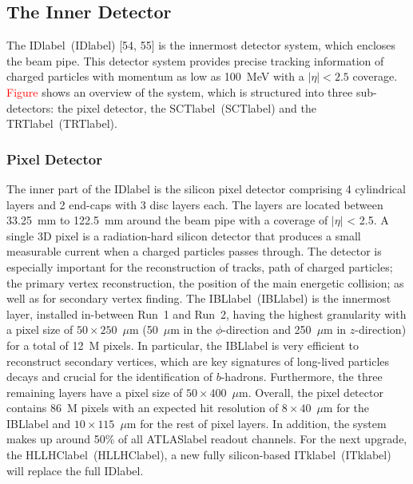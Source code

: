 \subsection{The Inner Detector}

The \acrlong{IDlabel}~(\acrshort{IDlabel}) [54, 55] is the innermost detector system, which encloses the beam pipe. This detector system provides precise tracking information of charged particles with momentum as low as 100~MeV with a $|\eta|<2.5$ coverage. \textcolor{red}{Figure} shows an overview of the system, which is structured into three sub-detectors: the pixel detector, the \acrlong{SCTlabel}~(\acrshort{SCTlabel}) and the \acrlong{TRTlabel}~(\acrshort{TRTlabel}).



\subsubsection*{Pixel Detector}

The inner part of the \acrshort{IDlabel} is the silicon pixel detector comprising 4 cylindrical layers and 2 end-caps with 3 disc layers each. The layers are located between 33.25~mm to 122.5~mm around the beam pipe with a coverage of $|\eta|$ < 2.5. A single 3D pixel is a radiation-hard silicon detector that produces a small measurable current when a charged particles passes through. The detector is especially important for the reconstruction of tracks, path of charged particles; the primary vertex reconstruction, the position of the main energetic collision; as well as for secondary vertex finding. The \acrlong{IBLlabel}~(\acrshort{IBLlabel}) is the innermost layer, installed in-between Run~1 and Run~2, having the highest granularity with a pixel size of $50\times 250$~$\mu$m (50~$\mu$m in the $\phi$-direction and 250~$\mu$m in $z$-direction) for a total of 12~M pixels. In particular, the \acrshort{IBLlabel} is very efficient to reconstruct secondary vertices, which are key signatures of long-lived particles decays and crucial for the identification of $b$-hadrons. Furthermore, the three remaining layers have a pixel size of $50\times 400$~$\mu$m. Overall, the pixel detector contains 86~M pixels with an expected hit resolution of $8\times 40$~$\mu$m for the \acrshort{IBLlabel} and $10\times 115$~$\mu$m for the rest of pixel layers. In addition, the system makes up around 50\% of all \acrshort{ATLASlabel} readout channels. For the next upgrade, the \acrlong{HLLHClabel}~(\acrshort{HLLHClabel}), a new fully silicon-based \acrlong{ITklabel}~(\acrshort{ITklabel}) will replace the full \acrshort{IDlabel}.

